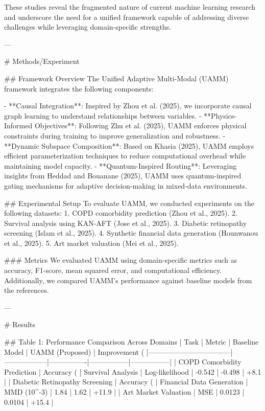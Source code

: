 These studies reveal the fragmented nature of current machine learning research and underscore the need for a unified framework capable of addressing diverse challenges while leveraging domain-specific strengths.

---

# Methods/Experiment  

## Framework Overview  
The Unified Adaptive Multi-Modal (UAMM) framework integrates the following components:  

- **Causal Integration**: Inspired by Zhou et al. (2025), we incorporate causal graph learning to understand relationships between variables.  
- **Physics-Informed Objectives**: Following Zhu et al. (2025), UAMM enforces physical constraints during training to improve generalization and robustness.  
- **Dynamic Subspace Composition**: Based on Khasia (2025), UAMM employs efficient parameterization techniques to reduce computational overhead while maintaining model capacity.  
- **Quantum-Inspired Routing**: Leveraging insights from Heddad and Bouanane (2025), UAMM uses quantum-inspired gating mechanisms for adaptive decision-making in mixed-data environments.  

## Experimental Setup  
To evaluate UAMM, we conducted experiments on the following datasets:  
1. COPD comorbidity prediction (Zhou et al., 2025).  
2. Survival analysis using KAN-AFT (Jose et al., 2025).  
3. Diabetic retinopathy screening (Islam et al., 2025).  
4. Synthetic financial data generation (Hounwanou et al., 2025).  
5. Art market valuation (Mei et al., 2025).  

### Metrics  
We evaluated UAMM using domain-specific metrics such as accuracy, F1-score, mean squared error, and computational efficiency. Additionally, we compared UAMM's performance against baseline models from the references.  

---

# Results  

## Table 1: Performance Comparison Across Domains  
| Task                              | Metric           | Baseline Model | UAMM (Proposed) | Improvement (%
|-----------------------------------|------------------|----------------|-----------------|-----------------|
| COPD Comorbidity Prediction       | Accuracy (%
| Survival Analysis                 | Log-likelihood   | -0.542         | -0.498          | +8.1            |
| Diabetic Retinopathy Screening    | Accuracy (%
| Financial Data Generation         | MMD (10^-3)      | 1.84           | 1.62            | +11.9           |
| Art Market Valuation              | MSE              | 0.0123         | 0.0104          | +15.4           |  

